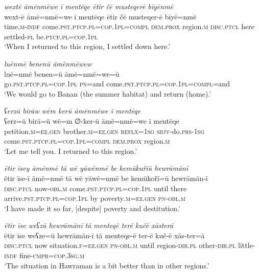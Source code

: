 \ea \label{ŽM.51}
\textit{wextē āmēnmēwe ī mentēqe ētir čē musteqerē bīyēnmē} \\ 
\gll wext-ē āmē=nmē=we ī mentēqe ētir čē musteqer-ē bīyē=nmē \\ 
 time\textsc{.m}\textsc{-indf} come\textsc{.pst}\textsc{.ptcp}\textsc{.pl}\textsc{=cop}\textsc{.\textsc{1pl}}\textsc{=compl} \textsc{dem.prox} region\textsc{.m} \textsc{disc}.\textsc{ptcl} here settled\textsc{\textsc{-pl}} be\textsc{.ptcp}\textsc{.pl}\textsc{=cop}\textsc{.\textsc{1pl}} \\ 
\glt `When I returned to this region, I settled down here.'
\z 
 
\ea \label{ŽM.52}
\textit{luēnmē benenū āmēnmēwew} \\ 
\gll luē=nmē benen=ū āmē=nmē=we=ū \\ 
 go\textsc{.pst}\textsc{.ptcp}\textsc{.pl}\textsc{=cop}\textsc{.\textsc{1pl}} \textsc{pn}=and come\textsc{.pst}\textsc{.ptcp}\textsc{.pl}\textsc{=cop}\textsc{.\textsc{1pl}}\textsc{=compl}=and \\ 
\glt `We would go to Banan (the summer habitat) and return (home).'
\z 
 
\ea \label{ŽM.53}
\textit{ʕerzū birāw wēm kerū āmēnmēwe ī mentēqe} \\ 
\gll ʕerz=ū birā=ū wē=m ∅-ker-ū āmē=nmē=we ī mentēqe \\ 
 petition\textsc{.m}\textsc{=ez.gen} brother\textsc{.m}\textsc{=ez.gen} \textsc{reflx}\textsc{=\textsc{1sg}} \textsc{sbjv-}do\textsc{.prs}\textsc{-\textsc{1sg}} come\textsc{.pst}\textsc{.ptcp}\textsc{.pl}\textsc{=cop}\textsc{.\textsc{1pl}}\textsc{=compl} \textsc{dem.prox} region\textsc{.m} \\ 
\glt `Let me tell you. I returned to this region.'
\z 
 
\ea \label{ŽM.54}
\textit{ētir īsey āmēnmē tā wē yāwēnmē be kemūkuřīū hewrāmānī} \\ 
\gll ētir īse-ī āmē=nmē tā wē yāwē=nmē be kemūkořī=ū hewrāmān-ī \\ 
 \textsc{disc}.\textsc{ptcl} now\textsc{-obl}\textsc{.m} come\textsc{.pst}\textsc{.ptcp}\textsc{.pl}\textsc{=cop}\textsc{.\textsc{1pl}} until there arrive\textsc{.pst}\textsc{.ptcp}\textsc{.pl}\textsc{=cop}\textsc{.\textsc{1pl}} by poverty\textsc{.m}\textsc{=ez.gen} \textsc{pn}\textsc{-obl}\textsc{.m} \\ 
\glt `I have made it so far, [despite] poverty and destitution.'
\z 
 
\ea \label{ŽM.55}
\textit{ētir īse weʕzū hewrāmānī tā menteqē terē kučē xāsterā} \\ 
\gll ētir īse weʕze=ū hewrāmān-ī tā menteqe-ē ter-ē kuč-ē xās-ter=ā \\ 
 \textsc{disc}.\textsc{ptcl} now situation\textsc{.f}\textsc{=ez.gen} \textsc{pn}\textsc{-obl}\textsc{.m} until region\textsc{-dir}\textsc{.pl} other\textsc{-dir}\textsc{.pl} little\textsc{-indf} fine\textsc{-cmpr}\textsc{=cop}\textsc{.3sg}\textsc{.m} \\ 
\glt `The situation in Hawraman is a bit better than in other regions.'
\z 
 
